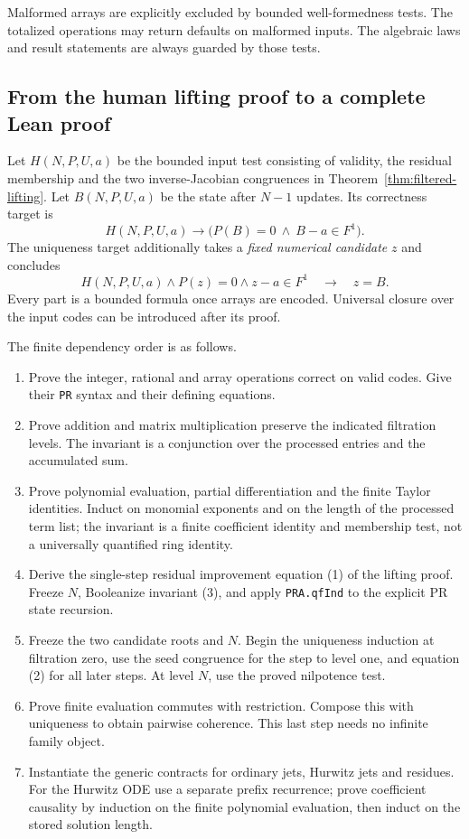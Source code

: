 Malformed arrays are explicitly excluded by bounded well-formedness tests.
The totalized operations may return defaults on malformed inputs. The
algebraic laws and result statements are always guarded by those tests.

\subsection{From the human lifting proof to a complete Lean proof}

Let \(H(N,P,U,a)\) be the bounded input test consisting of validity,
the residual membership and the two inverse-Jacobian congruences in
Theorem~\ref{thm:filtered-lifting}. Let \(B(N,P,U,a)\) be the state
after \(N-1\) updates. Its correctness target is
\[
 H(N,P,U,a)\to
 \bigl(P(B)=0\ \land\ B-a\in F^1\bigr).
\]
The uniqueness target additionally takes a \emph{fixed numerical candidate}
\(z\) and concludes
\[
 H(N,P,U,a)\land P(z)=0\land z-a\in F^1\quad\to\quad z=B.
\]
Every part is a bounded formula once arrays are encoded. Universal closure
over the input codes can be introduced after its proof.

The finite dependency order is as follows.
\begin{enumerate}
\item Prove the integer, rational and array operations correct on valid
codes. Give their \texttt{PR} syntax and their defining equations.
\item Prove addition and matrix multiplication preserve the indicated
filtration levels. The invariant is a conjunction over the processed
entries and the accumulated sum.
\item Prove polynomial evaluation, partial differentiation and the finite
Taylor identities. Induct on monomial exponents and on the length of
the processed term list; the invariant is a finite coefficient identity
and membership test, not a universally quantified ring identity.
\item Derive the single-step residual improvement equation (1) of the
lifting proof. Freeze \(N\), Booleanize invariant (3), and apply
\texttt{PRA.qfInd} to the explicit PR state recursion.
\item Freeze the two candidate roots and \(N\). Begin the uniqueness
induction at filtration zero, use the seed congruence for the step to
level one, and equation (2) for all later steps. At level \(N\), use
the proved nilpotence test.
\item Prove finite evaluation commutes with restriction. Compose this
with uniqueness to obtain pairwise coherence. This last step needs no
infinite family object.
\item Instantiate the generic contracts for ordinary jets, Hurwitz jets
and residues. For the Hurwitz ODE use a separate prefix recurrence;
prove coefficient causality by induction on the finite polynomial
evaluation, then induct on the stored solution length.
\end{enumerate}

